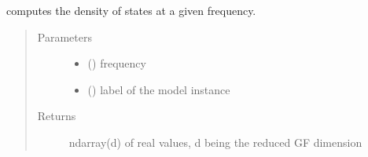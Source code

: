 \documentclass[letterpaper,10pt,english]{sphinxmanual}
\begin{document}
\begin{fulllineitems}
\label{\detokenize{functions:pyqcm.dos}}
\sphinxAtStartPar
computes the density of states at a given frequency.
\begin{quote}\begin{description}
\item[{Parameters}] \leavevmode\begin{itemize}
\item {} 
\sphinxAtStartPar
{} () \textendash{} frequency

\item {} 
\sphinxAtStartPar
{} () \textendash{} label of the model instance

\end{itemize}

\item[{Returns}] \leavevmode
\sphinxAtStartPar
ndarray(d) of real values, d being the reduced GF dimension

\end{description}\end{quote}

\end{fulllineitems}

\end{document}
